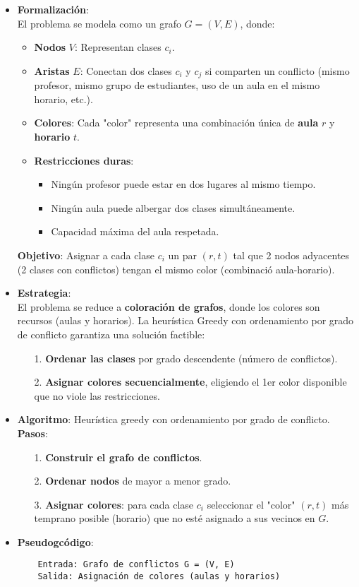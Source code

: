 \documentclass[12pt, a4paper]{article}
\begin{document}
\begin{itemize}
    \item \textbf{Formalización}:\\
    El problema se modela como un grafo $G=(V,E)$, donde:
    \begin{itemize}
        \item \textbf{Nodos} $V$: Representan clases $c_i$.
        \item \textbf{Aristas} $E$: Conectan dos clases $c_i$ y $c_j$ si comparten un conflicto (mismo profesor, mismo grupo de estudiantes, uso de un aula en el mismo horario, etc.).
        \item \textbf{Colores}: Cada "color" representa una combinación única de \textbf{aula} $r$ y \textbf{horario} $t$.
        \item \textbf{Restricciones duras}:
        \begin{itemize}
            \item Ningún profesor puede estar en dos lugares al mismo tiempo.
            \item Ningún aula puede albergar dos clases simultáneamente.
            \item Capacidad máxima del aula respetada.
        \end{itemize}
    \end{itemize}
    \textbf{Objetivo}: Asignar a cada clase $c_i$ un par $(r,t)$ tal que 2 nodos adyacentes (2 clases con conflictos) tengan el mismo color (combinació aula-horario).
    \item \textbf{Estrategia}:\\
    El problema se reduce a \textbf{coloración de grafos}, donde los colores son recursos (aulas y horarios). La heurística Greedy con ordenamiento por grado de conflicto garantiza una solución factible:
    \begin{itemize}
        \item[1.] \textbf{Ordenar las clases} por grado descendente (número de conflictos).
        \item[2.] \textbf{Asignar colores secuencialmente}, eligiendo el 1er color disponible que no viole las restricciones.
    \end{itemize}
    \item \textbf{Algoritmo}: Heurística greedy con ordenamiento por grado de conflicto.\\
    \textbf{Pasos}:
    \begin{itemize}
        \item[1.] \textbf{Construir el grafo de conflictos}.
        \item[2.] \textbf{Ordenar nodos} de mayor a menor grado.
        \item[3.] \textbf{Asignar colores}: para cada clase $c_i$ seleccionar el "color" $(r,t)$ más temprano posible (horario) que no esté asignado a sus vecinos en $G$.
    \end{itemize}
    \item \textbf{Pseudogcódigo}:
    \begin{verbatim}
    Entrada: Grafo de conflictos G = (V, E)
    Salida: Asignación de colores (aulas y horarios)
    

\end{verbatim}
\end{itemize}
\end{document}

